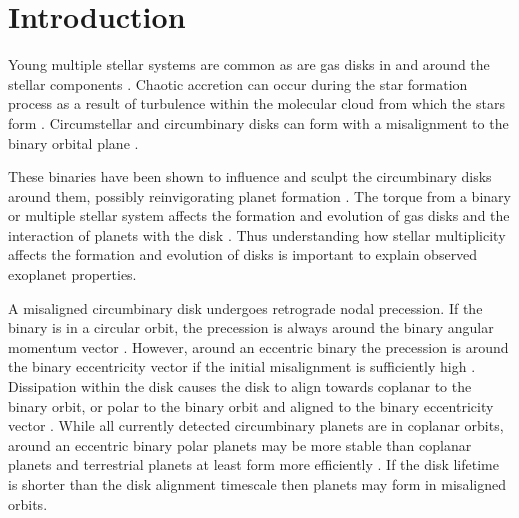 \documentclass{aa}
\begin{document}

   \maketitle
%

\section{Introduction}

Young multiple stellar systems are common \citep[e.g.][]{Ghez93,Duchene13} as are gas disks in and around the stellar components \citep{Akeson19}.
%
Chaotic accretion can occur during the star formation process as a result of turbulence within the molecular cloud from which the stars form \citep{Bate2003,McKee2007}.
%
Circumstellar and circumbinary disks can form with a misalignment to the binary orbital plane \citep{Monin2007, Bate2018}.

These binaries have been shown to influence and sculpt the circumbinary disks around them, possibly reinvigorating planet formation \citep{Cabrit06,Rodriguez18}.
%
%
The torque from a binary or multiple stellar system affects the formation and evolution of gas disks \citep[e.g.][]{Nelson2000, Mayer2005,Boss2006, Fu2017} and the interaction of planets with the disk \citep{Picogna2015,Lubow2016,Martin2016}.
%
Thus understanding how stellar multiplicity affects the formation and evolution of disks is important to explain observed exoplanet properties.

A misaligned circumbinary disk undergoes retrograde nodal precession.
%
If the binary is in a circular orbit, the precession is always around the binary angular momentum vector \citep[e.g.][]{Larwood1996}.
%
However, around an eccentric binary the precession is around the binary eccentricity vector if the initial misalignment is sufficiently high \citep{Farago2010,Aly2015}.
%
Dissipation within the disk causes the disk to align towards coplanar to the binary orbit, or polar to the binary orbit and aligned to the binary eccentricity vector \citep{Martin17,Lubow2018,Zanazzi2018}.
%
While all currently detected circumbinary planets are in coplanar orbits, around an eccentric binary polar planets may be more stable than coplanar planets \citep{Chen2020} and terrestrial planets at least form more efficiently \citep{Childs2021}.
%
If the disk lifetime is shorter than the disk alignment timescale then planets may form in misaligned orbits.
\end{document}
